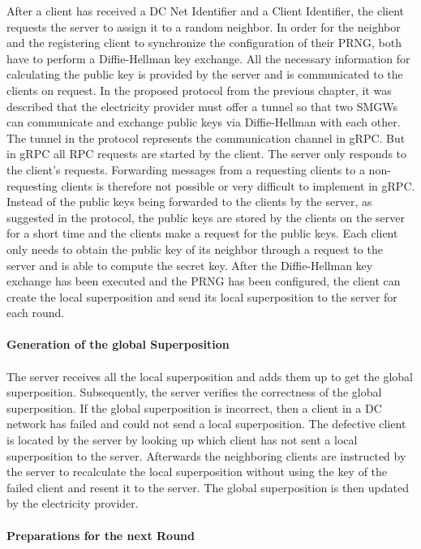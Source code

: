 After a client has received a DC Net Identifier and a Client Identifier, the client requests the server to assign it to a random neighbor. In order for the neighbor and the registering client to synchronize the configuration of their \gls{PRNG}, both have to perform a Diffie-Hellman key exchange. All the necessary information for calculating the public key is provided by the server and is communicated to the clients on request. In the proposed protocol from the previous chapter, it was described that the electricity provider must offer a tunnel so that two \gls{SMGW}s can communicate and exchange public keys via Diffie-Hellman with each other. The tunnel in the protocol represents the communication channel in gRPC. But in gRPC all \gls{RPC} requests are started by the client. The server only responds to the client's requests. Forwarding messages from a requesting clients to a non-requesting clients is therefore not possible or very difficult to implement in gRPC. Instead of the public keys being forwarded to the clients by the server, as suggested in the protocol, the public keys are stored by the clients on the server for a short time and the clients make a request for the public keys. 
Each client only needs to obtain the public key of its neighbor through a request to the server and is able to compute the secret key. After the Diffie-Hellman key exchange has been executed and the \gls{PRNG} has been configured, the client can create the local superposition and send its local superposition to the server for each round. 
\\
\\
\textbf{Generation of the global Superposition}
\\
\\
The server receives all the local superposition and adds them up to get the global superposition. Subsequently, the server verifies the correctness of the global superposition. If the global superposition is incorrect, then a client in a DC network has failed and could not send a local superposition. The defective client is located by the server by looking up which client has not sent a local superposition to the server. Afterwards the neighboring clients are instructed by the server to recalculate the local superposition without using the key of the failed client and resent it to the server. The global superposition is then updated by the electricity provider. \\
\\
\textbf{Preparations for the next Round}
\\
